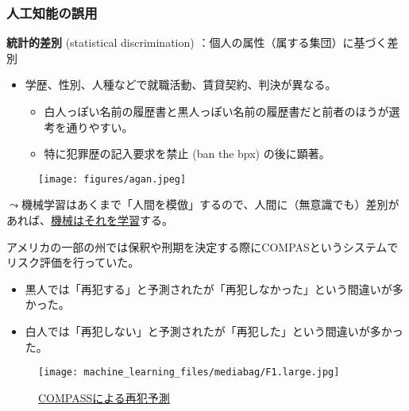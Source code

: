 \documentclass[
  xelatex,
  ja=standard]{bxjsarticle}
\providecommand{\tightlist}{%
  \setlength{\itemsep}{0pt}\setlength{\parskip}{0pt}}\usepackage{longtable,booktabs,array}
\begin{document}
\hypertarget{ux4ebaux5de5ux77e5ux80fdux306eux8aa4ux7528}{%
\subsubsection{人工知能の誤用}\label{ux4ebaux5de5ux77e5ux80fdux306eux8aa4ux7528}}

\textbf{統計的差別} (statistical discrimination)
：個人の属性（属する集団）に基づく差別

\begin{itemize}
\tightlist
\item
  学歴、性別、人種などで就職活動、賃貸契約、判決が異なる。

  \begin{itemize}
  \tightlist
  \item
    白人っぽい名前の履歴書と黒人っぽい名前の履歴書だと前者のほうが選考を通りやすい\citep{agan2018}。
  \item
    特に犯罪歴の記入要求を禁止 (ban the bpx) の後に顕著。
  \end{itemize}
\end{itemize}

\begin{figure}[htpb]

{\centering \texttt{[image: figures/agan.jpeg]}

}

\caption{\citet{agan2018}}

\end{figure}

\(\leadsto\)機械学習はあくまで「人間を模倣」するので、人間に（無意識でも）差別があれば、\href{https://ainow.ai/2020/02/17/183256/}{機械はそれを学習}する。

アメリカの一部の州では保釈や刑期を決定する際にCOMPASというシステムでリスク評価を行っていた。

\begin{itemize}
\tightlist
\item
  黒人では「再犯する」と予測されたが「再犯しなかった」という間違いが多かった。
\item
  白人では「再犯しない」と予測されたが「再犯した」という間違いが多かった。
\end{itemize}

\begin{figure}[htpb]

{\centering \texttt{[image: machine\_learning\_files/mediabag/F1.large.jpg]}

}

\caption{\href{https://www.axion.zone/is-the-recidivism-prediction-algorithm-fair-to-race/}{COMPASSによる再犯予測}}

\end{figure}
\end{document}
